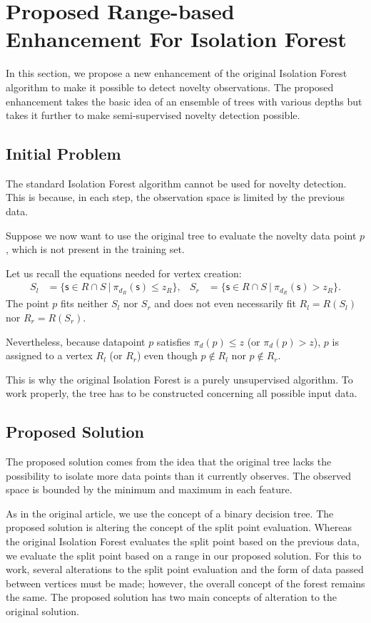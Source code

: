 \section{Proposed Range-based Enhancement For Isolation Forest}
\label{sec:novelty_isolation_forest}
In this section, we propose a new enhancement of the original Isolation Forest algorithm to make it possible to detect novelty observations.
The proposed enhancement takes the basic idea of an ensemble of trees with various depths but takes it further to make semi-supervised novelty detection possible.

\subsection{Initial Problem}
\label{sec:InitialProblem}
 The standard Isolation Forest algorithm cannot be used for novelty detection. This is because, in each step, the observation space is limited by the previous data.


Suppose we now want to use the original tree to evaluate the novelty data point $p$, which is not present in the training set.

Let us recall the equations needed for vertex creation:
\begin{align*}
S_l &= \{ \mathsf{s} \in{R \cap S}\ |\ \pi_{d_R}(\mathsf{s})\le z_R\},&
S_r &= \{ \mathsf{s} \in{R \cap S}\ |\ \pi_{d_R}(\mathsf{s}) > z_R\}.
\end{align*}
The point $p$ fits neither $S_l$ nor $S_r$ and does not even necessarily fit $R_l = R(S_l)$ nor $R_r = R(S_r)$. 

Nevertheless, because datapoint $p$ satisfies  $\pi_d(p) \le z$ (or $\pi_d(p) > z$), $p$ is assigned to a vertex $R_l$ (or $R_r$) even though $p \notin R_l$ nor $p \notin R_r$.

This is why the original Isolation Forest is a purely unsupervised algorithm. To work properly, the tree has to be constructed concerning all possible input data.

\subsection{Proposed Solution}
The proposed solution comes from the idea that the original tree lacks the possibility to isolate more data points than it currently observes.
The observed space is bounded by the minimum and maximum in each feature.

As in the original article, we use the concept of a binary decision tree. The proposed solution is altering the concept of the split point evaluation. Whereas the original Isolation Forest evaluates the split point based on the previous data, we
evaluate the split point based on a range in our proposed solution. For this to work, several alterations to the split point evaluation and the form of data passed between vertices must be made; however, the overall concept of the forest remains the same.
The proposed solution has two main concepts of alteration to the original solution.

